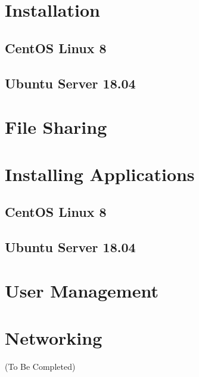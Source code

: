 \documentclass[
10pt, %
letterpaper, %
oneside, %
headinclude,footinclude, %
BCOR5mm, %
]{scrartcl}
\begin{document}
\let\thefootnote\relax{}

\newpage


\section{Installation}
\subsection{CentOS Linux 8}

\subsection{Ubuntu Server 18.04}


\section{File Sharing}


\section{Installing Applications}
\subsection{CentOS Linux 8}

\subsection{Ubuntu Server 18.04}


\section{User Management}


\section{Networking}
(To Be Completed)
\end{document}

